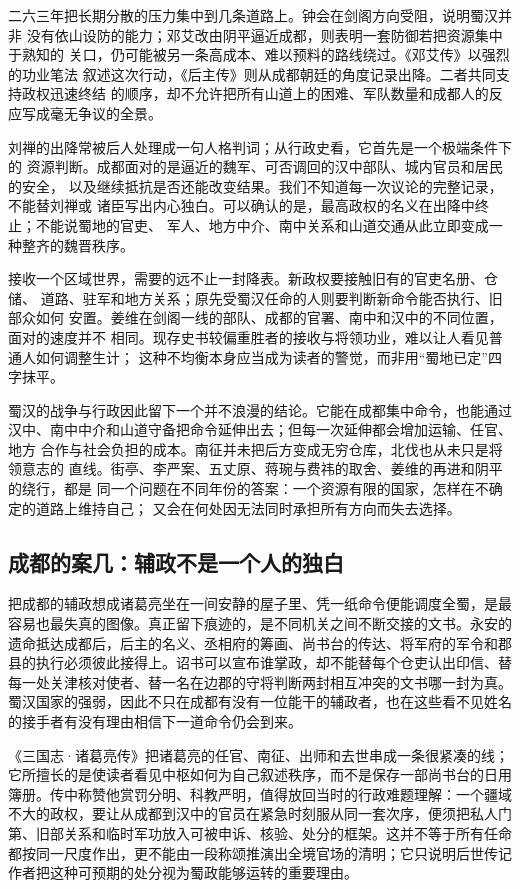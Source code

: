 二六三年把长期分散的压力集中到几条道路上。钟会在剑阁方向受阻，说明蜀汉并非
没有依山设防的能力；邓艾改由阴平逼近成都，则表明一套防御若把资源集中于熟知的
关口，仍可能被另一条高成本、难以预料的路线绕过。《邓艾传》以强烈的功业笔法
叙述这次行动，《后主传》则从成都朝廷的角度记录出降。二者共同支持政权迅速终结
的顺序，却不允许把所有山道上的困难、军队数量和成都人的反应写成毫无争议的全景。

刘禅的出降常被后人处理成一句人格判词；从行政史看，它首先是一个极端条件下的
资源判断。成都面对的是逼近的魏军、可否调回的汉中部队、城内官员和居民的安全，
以及继续抵抗是否还能改变结果。我们不知道每一次议论的完整记录，不能替刘禅或
诸臣写出内心独白。可以确认的是，最高政权的名义在出降中终止；不能说蜀地的官吏、
军人、地方中介、南中关系和山道交通从此立即变成一种整齐的魏晋秩序。

接收一个区域世界，需要的远不止一封降表。新政权要接触旧有的官吏名册、仓储、
道路、驻军和地方关系；原先受蜀汉任命的人则要判断新命令能否执行、旧部众如何
安置。姜维在剑阁一线的部队、成都的官署、南中和汉中的不同位置，面对的速度并不
相同。现存史书较偏重胜者的接收与将领功业，难以让人看见普通人如何调整生计；
这种不均衡本身应当成为读者的警觉，而非用“蜀地已定”四字抹平。

蜀汉的战争与行政因此留下一个并不浪漫的结论。它能在成都集中命令，也能通过
汉中、南中中介和山道守备把命令延伸出去；但每一次延伸都会增加运输、任官、地方
合作与社会负担的成本。南征并未把后方变成无穷仓库，北伐也从未只是将领意志的
直线。街亭、李严案、五丈原、蒋琬与费祎的取舍、姜维的再进和阴平的绕行，都是
同一个问题在不同年份的答案：一个资源有限的国家，怎样在不确定的道路上维持自己；
又会在何处因无法同时承担所有方向而失去选择。

\subsection{成都的案几：辅政不是一个人的独白}

把成都的辅政想成诸葛亮坐在一间安静的屋子里、凭一纸命令便能调度全蜀，是最容易也最失真的图像。真正留下痕迹的，是不同机关之间不断交接的文书。永安的遗命抵达成都后，后主的名义、丞相府的筹画、尚书台的传达、将军府的军令和郡县的执行必须彼此接得上。诏书可以宣布谁掌政，却不能替每个仓吏认出印信、替每一处关津核对使者、替一名在边郡的守将判断两封相互冲突的文书哪一封为真。蜀汉国家的强弱，因此不只在成都有没有一位能干的辅政者，也在这些看不见姓名的接手者有没有理由相信下一道命令仍会到来。

《三国志·诸葛亮传》把诸葛亮的任官、南征、出师和去世串成一条很紧凑的线；它所擅长的是使读者看见中枢如何为自己叙述秩序，而不是保存一部尚书台的日用簿册。传中称赞他赏罚分明、科教严明，值得放回当时的行政难题理解：一个疆域不大的政权，要让从成都到汉中的官员在紧急时刻服从同一套次序，便须把私人门第、旧部关系和临时军功放入可被申诉、核验、处分的框架。这并不等于所有任命都按同一尺度作出，更不能由一段称颂推演出全境官场的清明；它只说明后世传记作者把这种可预期的处分视为蜀政能够运转的重要理由。

